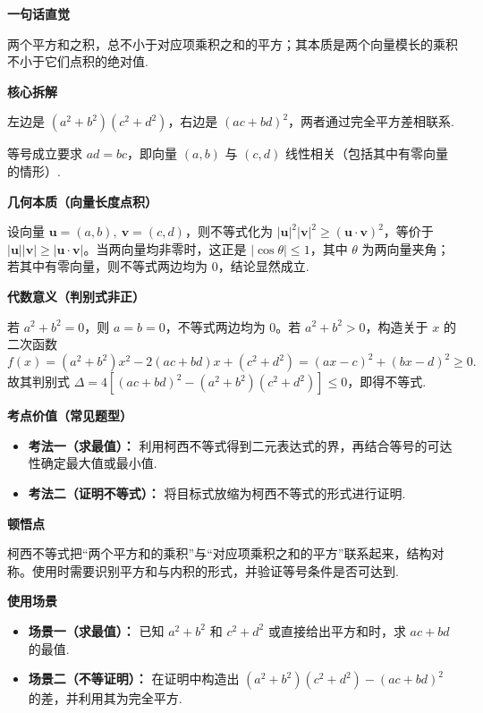\begin{explanationbox}
	\textbf{\textcolor{CExplanation}{一句话直觉}}

		两个平方和之积，总不小于对应项乘积之和的平方；其本质是两个向量模长的乘积不小于它们点积的绝对值.

	\medskip
	\textbf{\textcolor{CExplanation}{核心拆解}}
	\begin{description}[style=nextline, leftmargin=2.8em, labelsep=0.5em, itemsep=0.45em]
		\item[\textbf{要点一（平方结构）：}] 左边是 $(a^2+b^2)(c^2+d^2)$，右边是 $(ac+bd)^2$，两者通过完全平方差相联系.
		\item[\textbf{要点二（等号条件）：}] 等号成立要求 $ad=bc$，即向量 $(a,b)$ 与 $(c,d)$ 线性相关（包括其中有零向量的情形）.
	\end{description}

	\medskip
	\textbf{\textcolor{CExplanation}{几何本质（向量长度点积）}}

		设向量 $\boldsymbol{u}=(a,b),\ \boldsymbol{v}=(c,d)$，则不等式化为 $|\boldsymbol{u}|^2|\boldsymbol{v}|^2\ge (\boldsymbol{u}\cdot\boldsymbol{v})^2$，等价于 $|\boldsymbol{u}||\boldsymbol{v}|\ge |\boldsymbol{u}\cdot\boldsymbol{v}|$。当两向量均非零时，这正是 $|\cos\theta|\le 1$，其中 $\theta$ 为两向量夹角；若其中有零向量，则不等式两边均为 $0$，结论显然成立.

	\medskip
	\textbf{\textcolor{CExplanation}{代数意义（判别式非正）}}

		若 $a^2+b^2=0$，则 $a=b=0$，不等式两边均为 $0$。若 $a^2+b^2>0$，构造关于 $x$ 的二次函数
		\[
			f(x)=(a^2+b^2)x^2-2(ac+bd)x+(c^2+d^2)=(ax-c)^2+(bx-d)^2\ge0.
		\]
		故其判别式 $\Delta=4[(ac+bd)^2-(a^2+b^2)(c^2+d^2)]\le0$，即得不等式.

	\medskip
	\textbf{\textcolor{CExplanation}{考点价值（常见题型）}}
	\begin{itemize}[leftmargin=*, itemsep=0.5em, topsep=0.4em]
		\item \textbf{考法一（求最值）：} 利用柯西不等式得到二元表达式的界，再结合等号的可达性确定最大值或最小值.
		\item \textbf{考法二（证明不等式）：} 将目标式放缩为柯西不等式的形式进行证明.
	\end{itemize}

	\medskip
	\textbf{\textcolor{CExplanation}{顿悟点}}

		柯西不等式把“两个平方和的乘积”与“对应项乘积之和的平方”联系起来，结构对称。使用时需要识别平方和与内积的形式，并验证等号条件是否可达到.

	\medskip
	\textbf{\textcolor{CExplanation}{使用场景}}
	\begin{itemize}[leftmargin=*, itemsep=0.5em, topsep=0.4em]
		\item \textbf{场景一（求最值）：} 已知 $a^2+b^2$ 和 $c^2+d^2$ 或直接给出平方和时，求 $ac+bd$ 的最值.
		\item \textbf{场景二（不等证明）：} 在证明中构造出 $(a^2+b^2)(c^2+d^2)-(ac+bd)^2$ 的差，并利用其为完全平方.
	\end{itemize}
\end{explanationbox}